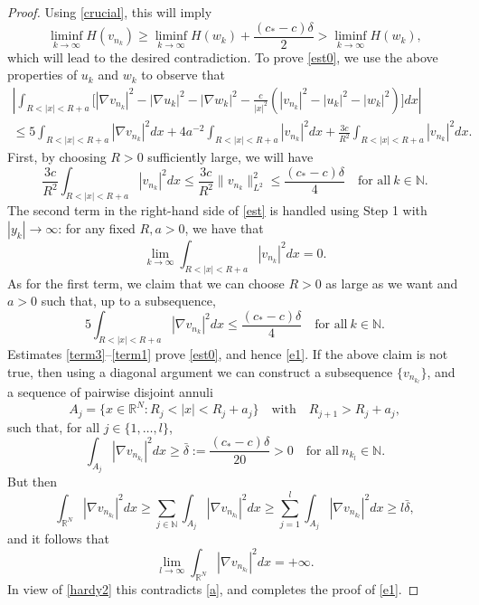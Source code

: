 \documentclass[reqno]{amsart}
\newcommand{\real}{\mathbb{R}}
\newcommand{\rn}{\real^N}
\newcommand{\intrn}{\int_{\real^N}}
\newcommand{\N}{\mathbb{N}}
\let\le=\leqslant
\let\ge= \geqslant
\theoremstyle{plain}
\theoremstyle{definition}
\numberwithin{equation}{section}
\begin{document}
\begin{proof}
Using \eqref{crucial}, this will imply
\begin{equation}\label{e1}
\liminf_{k\rightarrow\infty}H(v_{n_k})
\ge\liminf_{k\rightarrow\infty}H(w_k)+\frac{(c_*-c)\delta}{2}>\liminf_{k\rightarrow\infty}H(w_k),
\end{equation}
which will lead to the desired contradiction.
To prove \eqref{est0}, we use the above properties of $u_k$ and $w_k$ to observe that
\begin{multline}\label{est}
\left|\int_{R<|x|<R+a}\Big[|\nabla v_{n_k}|^2-|\nabla u_k|^2-|\nabla w_k|^2
-\frac{c}{|x|^2}\left(|v_{n_k}|^2-|u_k|^2-|w_k|^2\right)\Big]dx\right| \\
\le 5\int_{R<|x|<R+a}|\nabla v_{n_k}|^2dx+4a^{-2}\int_{R<|x|<R+a}|v_{n_k}|^2dx
+\frac{3c}{R^2}\int_{R<|x|<R+a}|v_{n_k}|^2dx.
\end{multline}
First, by choosing $R>0$ sufficiently large, we will have
\begin{equation}\label{term3}
\frac{3c}{R^2}\int_{R<|x|<R+a}|v_{n_k}|^2dx  
\le \frac{3c}{R^2} \|v_{n_k}\|_{L^2}^2 \le \frac{(c_*-c)\delta}{4} \quad\text{for all} \ k\in\N.
\end{equation}
The second term in the right-hand side of \eqref{est} is handled using Step 1 with $|y_k|\to\infty$: 
for any fixed $R,a>0$, we have that
\begin{equation}\label{term2}
\lim_{k\to\infty} \int_{R<|x|<R+a}|v_{n_k}|^2dx=0.
\end{equation}
As for the first term, we claim that we can choose $R>0$ as large as we want and $a>0$ such that,
up to a subsequence,
\begin{equation}\label{term1}
5\int_{R<|x|<R+a}|\nabla v_{n_k}|^2dx\le \frac{(c_*-c)\delta}{4} \quad\text{for all} \ k\in\N.
\end{equation}
Estimates \eqref{term3}--\eqref{term1} prove \eqref{est0}, and hence \eqref{e1}.
If the above claim is not true, then using a diagonal argument we can construct a 
subsequence $\{v_{n_{k_l}}\}$, and a sequence of pairwise disjoint annuli
\[
A_j=\{x\in\rn : R_j<|x|<R_j+a_j\} \quad\text{with}\quad R_{j+1}>R_j+a_j,
\]
such that, for all $j\in\{1,\dots,l\}$,
\[
\int_{A_j}|\nabla v_{n_{k_l}}|^2dx\ge \bar \delta:= \frac{(c_*-c)\delta}{20}>0 \quad\text{for all} \ n_{k_l}\in\N.
\]
But then
\[
\intrn|\nabla v_{n_{k_l}}|^2dx \ge \sum_{j\in\N}\int_{A_j}|\nabla v_{n_{k_l}}|^2dx
\ge \sum_{j=1}^l\int_{A_j}|\nabla v_{n_{k_l}}|^2dx \ge l\bar\delta,
\]
and it follows that
\[
\lim_{l\to\infty}\intrn|\nabla v_{n_{k_l}}|^2dx=+\infty.
\]
In view of \eqref{hardy2} this contradicts \eqref{a}, and completes the proof of \eqref{e1}.


\end{proof}
\end{document}
